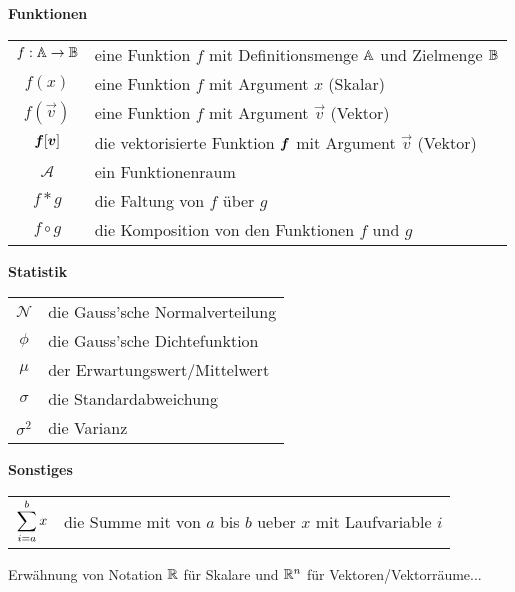 \begin{center}\textbf{Funktionen}\end{center}
\begin{tabular}{cl}
  $f: \mathbb{A} \to \mathbb{B}$ & eine Funktion $f$ mit Definitionsmenge $\mathbb{A}$ und Zielmenge $\mathbb{B}$ \\
  $f(x)$ & eine Funktion $f$ mit Argument $x$ (Skalar) \\
  $f(\vec{v})$ & eine Funktion $f$ mit Argument $\vec{v}$ (Vektor) \\
  $\bm{f}[\bm{v}]$ & die vektorisierte Funktion $\bm{f}$ mit Argument $\vec{v}$ (Vektor) \\
  $\mathcal{A}$ & ein Funktionenraum \\
  $f * g$ & die Faltung von $f$ über $g$ \\
  $f \circ g$ & die Komposition von den Funktionen $f$ und $g$ \\

\end{tabular}

\begin{center}\textbf{Statistik}\end{center}
\begin{tabular}{cl}
  $\mathcal{N}$ & die Gauss'sche Normalverteilung \\
  $\phi$ & die Gauss'sche Dichtefunktion \\
  $\mu$ & der Erwartungswert/Mittelwert \\
  $\sigma$ & die Standardabweichung \\
  $\sigma^2$ & die Varianz
\end{tabular}

\begin{center}\textbf{Sonstiges}\end{center}
\begin{tabular}{cl}
  $\displaystyle\sum_{i=a}^b x$ & die Summe mit von $a$ bis $b$ ueber $x$ mit Laufvariable $i$ \\
\end{tabular}

Erwähnung von Notation $\mathbb{R}$ für Skalare und $\mathbb{R}^n$ für Vektoren/Vektorräume...


